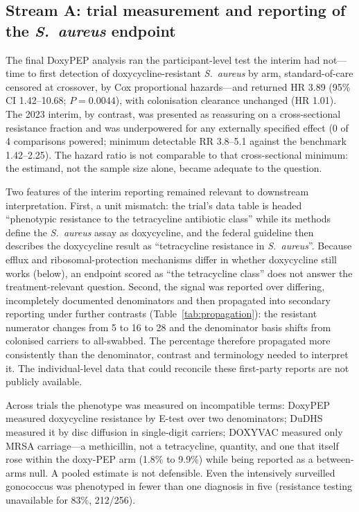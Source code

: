 \documentclass[12pt,a4paper]{article}
\newcommand{\sa}{\emph{S.~aureus}}
\begin{document}
\subsection*{Stream A: trial measurement and reporting of the \sa{} endpoint}
The final DoxyPEP
analysis ran the participant-level test the interim had not---time to first
detection of doxycycline-resistant \sa{} by arm, standard-of-care censored at
crossover, by Cox proportional hazards---and returned HR 3.89 (95\% CI
1.42--10.68; $P=0.0044$), with colonisation clearance unchanged (HR
1.01).\cite{luetkemeyer2025} The 2023 interim, by contrast, was presented as reassuring
on a cross-sectional resistance fraction and was underpowered for any externally
specified effect (0 of 4 comparisons powered; minimum detectable RR 3.8--5.1
against the benchmark 1.42--2.25). The hazard ratio is not comparable to that
cross-sectional minimum: the estimand, not the sample size alone, became adequate
to the question.

Two features of the interim reporting remained relevant to downstream interpretation.
First, a unit mismatch: the trial's data table is headed ``phenotypic resistance
to the tetracycline antibiotic class'' while its methods define the \sa{} assay
as doxycycline, and the federal guideline then describes the doxycycline result
as ``tetracycline resistance in \sa{}''.\cite{cdc2024doxypep} Because efflux and
ribosomal-protection mechanisms differ in whether doxycycline still works
(below), an endpoint scored as ``the tetracycline class'' does not answer the
treatment-relevant question. Second, the signal was reported over differing,
incompletely documented denominators and then propagated into secondary reporting
under further contrasts (Table~\ref{tab:propagation}): the resistant numerator
changes from 5 to 16 to 28 and the denominator basis shifts from colonised
carriers to all-swabbed. The percentage therefore propagated more consistently
than the denominator, contrast and terminology needed to interpret it. The individual-level
data that could reconcile these first-party reports are not publicly
available.\cite{luetkemeyer2023}

Across trials the phenotype was measured on incompatible terms: DoxyPEP measured
doxycycline resistance by E-test over two denominators; DuDHS measured it by disc
diffusion in single-digit carriers; DOXYVAC measured only MRSA carriage---a
methicillin, not a tetracycline, quantity, and one that itself rose within the
doxy-PEP arm (1.8\% to 9.9\%) while being reported as a between-arms
null.\cite{vanbaelen2024c} A pooled estimate is not defensible. Even the intensively surveilled gonococcus was phenotyped in fewer than one diagnosis in five (resistance testing unavailable for 83\%, 212/256).\cite{luetkemeyer2023croi}
\end{document}
